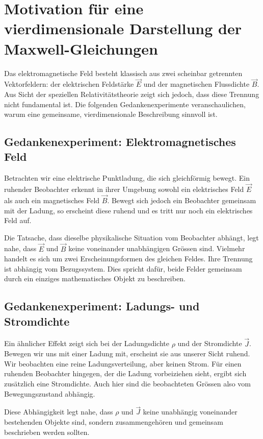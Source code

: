 \section{Motivation für eine vierdimensionale Darstellung der Maxwell-Gleichungen}
\label{maxwell:motivation}

Das elektromagnetische Feld besteht klassisch aus zwei scheinbar getrennten Vektorfeldern: der elektrischen Feldstärke \( \vec{E} \) und der magnetischen Flussdichte \( \vec{B} \). Aus Sicht der speziellen Relativitätstheorie zeigt sich jedoch, dass diese Trennung nicht fundamental ist. Die folgenden Gedankenexperimente veranschaulichen, warum eine gemeinsame, vierdimensionale Beschreibung sinnvoll ist.

\subsection{Gedankenexperiment: Elektromagnetisches Feld}

Betrachten wir eine elektrische Punktladung, die sich gleichförmig bewegt.
Ein ruhender Beobachter erkennt in ihrer Umgebung sowohl ein elektrisches Feld \( \vec{E} \) als auch ein magnetisches Feld \( \vec{B} \).
Bewegt sich jedoch ein Beobachter gemeinsam mit der Ladung, so erscheint diese ruhend und es tritt nur noch ein elektrisches Feld auf. 

Die Tatsache, dass dieselbe physikalische Situation vom Beobachter abhängt, legt nahe, dass \( \vec{E} \) und \( \vec{B} \) keine voneinander unabhängigen Grössen sind.
Vielmehr handelt es sich um zwei Erscheinungsformen des gleichen Feldes.
Ihre Trennung ist abhängig vom Bezugssystem.
Dies spricht dafür, beide Felder gemeinsam durch ein einziges mathematisches Objekt zu beschreiben.

\subsection{Gedankenexperiment: Ladungs- und Stromdichte}

Ein ähnlicher Effekt zeigt sich bei der Ladungsdichte \( \rho \) und der Stromdichte \( \vec{J} \).
Bewegen wir uns mit einer Ladung mit, erscheint sie aus unserer Sicht ruhend.
Wir beobachten eine reine Ladungsverteilung, aber keinen Strom.
Für einen ruhenden Beobachter hingegen, der die Ladung vorbeiziehen sieht, ergibt sich zusätzlich eine Stromdichte.
Auch hier sind die beobachteten Grössen also vom Bewegungszustand abhängig.

Diese Abhängigkeit legt nahe, dass \( \rho \) und \( \vec{J} \) keine unabhängig voneinander bestehenden Objekte sind, sondern zusammengehören und gemeinsam beschrieben werden sollten.

